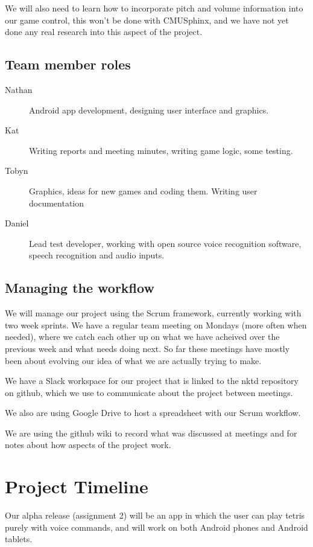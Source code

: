 \documentclass[11pt, oneside]{article}
\begin{document}
We will also need to learn how to incorporate pitch and volume
information into our game control, this won't be done with CMUSphinx,
and we have not yet done any real research into this aspect of the
project.


\subsection*{Team member roles}

\begin{description}
\item [Nathan] Android app development, designing user interface and graphics.
\item [Kat] Writing reports and meeting minutes, writing game logic, some testing.
\item [Tobyn] Graphics, ideas for new games and coding them. Writing user documentation
\item [Daniel] Lead test developer, working with open source voice recognition software, speech recognition and audio inputs.
\end{description}


\subsection*{Managing the workflow}

We will manage our project using the Scrum framework, currently
working with two week sprints. We have a regular team meeting on
Mondays (more often when needed), where we catch each other up on what
we have acheived over the previous week and what needs doing next. So
far these meetings have mostly been about evolving our idea of what we
are actually trying to make.

We have a Slack workspace for our project that is linked to the nktd
repository on github, which we use to communicate about the project
between meetings.

We also are using Google Drive to host a spreadsheet with our Scrum
workflow.

We are using the github wiki to record what was discussed at meetings
and for notes about how aspects of the project work.


\section*{Project Timeline}

Our alpha release (assignment 2) will be an app in which the user can play tetris purely with voice commands, and will work on both Android phones and Android tablets.
\end{document}
